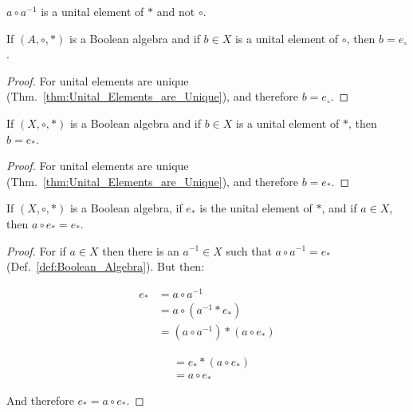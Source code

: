     $a\circ{a}^{\minus{1}}$ is a unital element of $*$ and not $\circ$.
    \begin{theorem}
        If $(A,\circ,*)$ is a Boolean algebra and if $b\in{X}$ is a
        unital element of $\circ$, then $b=e_{\circ}$.
    \end{theorem}
    \begin{proof}
        For unital elements are unique
        (Thm.~\ref{thm:Unital_Elements_are_Unique}), and therefore
        $b=e_{\circ}$.
    \end{proof}
    \begin{theorem}
        If $(X,\circ,*)$ is a Boolean algebra and if $b\in{X}$ is a
        unital element of $*$, then $b=e_{*}$.
    \end{theorem}
    \begin{proof}
        For unital elements are unique
        (Thm.~\ref{thm:Unital_Elements_are_Unique}), and therefore $b=e_{*}$.
    \end{proof}
    \begin{theorem}
        If $(X,\circ,*)$ is a Boolean algebra, if $e_{*}$ is the unital
        element of $*$, and if $a\in{X}$, then $a\circ{e}_{*}=e_{*}$.
    \end{theorem}
    \begin{proof}
        For if $a\in{X}$ then there is an $a^{\minus{1}}\in{X}$ such that
        $a\circ{a}^{\minus{1}}=e_{*}$ (Def.~\ref{def:Boolean_Algebra}).
        But then:
        \par\vspace{-2.5ex}
        \begin{minipage}[t]{0.51\textwidth}
            \centering
            \begin{align}
                e_{*}&=a\circ{a}^{\minus{1}}
                \tag{Complement}\\
                &=a\circ(a^{\minus{1}}*e_{*})
                \tag{Identity}\\
                &=(a\circ{a}^{\minus{1}})*(a\circ{e}_{*})
                \tag{Distributivity}
            \end{align}
        \end{minipage}
        \hfill
        \begin{minipage}[t]{0.47\textwidth}
            \centering
            \begin{align}
                &=e_{*}*(a\circ{e}_{*})
                \tag{Complement}\\
                &=a\circ{e}_{*}
                \tag{Identity}
            \end{align}
        \end{minipage}
        \par\vspace{2.5ex}
        And therefore $e_{*}=a\circ{e}_{*}$.
    \end{proof}
